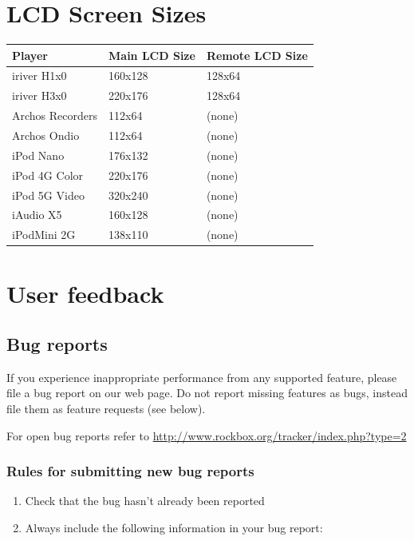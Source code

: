 \chapter{LCD Screen Sizes}
\begin{center}
  \begin{tabularx}{.8\textwidth}{lXX}\toprule
    \textbf{Player} & \textbf{Main LCD Size} & \textbf{Remote LCD Size}\\\midrule
    iriver H1x0 & 160x128 & 128x64\\
    iriver H3x0 & 220x176 & 128x64\\
    Archos Recorders & 112x64 & (none)\\ 
    Archos Ondio & 112x64 & (none)\\
    iPod Nano & 176x132 & (none)\\
    iPod 4G Color & 220x176 & (none)\\
    iPod 5G Video & 320x240 & (none)\\
    iAudio X5 & 160x128 & (none)\\
    iPodMini 2G &138x110 & (none) \\\bottomrule
  \end{tabularx}
\end{center}


\chapter{User feedback}
\section{Bug reports}
If you experience inappropriate performance from any supported feature,
please file a bug report on our web page. Do not report missing
features as bugs, instead file them as feature requests (see below).

For open bug reports refer to
\url{http://www.rockbox.org/tracker/index.php?type=2}

\subsection{Rules for submitting new bug reports}

\begin{enumerate}
\item  Check that the bug hasn't already been reported
\item  Always include the following information in your bug report:
\end{enumerate}

